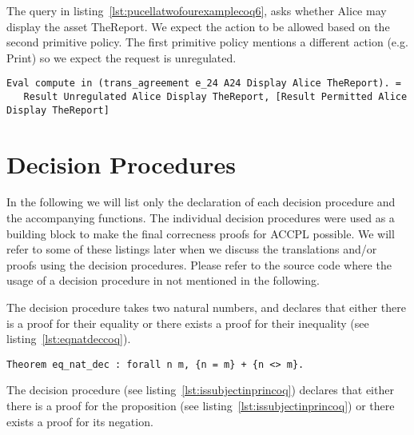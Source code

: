 The query in listing~\ref{lst:pucellatwofourexamplecoq6}, asks whether Alice may display the asset TheReport. We expect the action to be allowed based on the second primitive policy. The first primitive policy mentions a different action (e.g. Print) so we expect the request is unregulated. 

\begin{minipage}[c]{0.95\textwidth}
\begin{lstlisting}
Eval compute in (trans_agreement e_24 A24 Display Alice TheReport). = 
   Result Unregulated Alice Display TheReport, [Result Permitted Alice Display TheReport]
\end{lstlisting}
\end{minipage} 






\section{Decision Procedures}\label{sec:decprocs}

In the following we will list only the declaration of each decision procedure and the accompanying functions. The individual decision procedures were used as a building block to make the final correcness proofs for \ac{ACCPL} possible. We will refer to some of these listings later when we discuss the translations and/or proofs using the decision procedures. Please refer to the source code where the usage of a decision procedure in not mentioned in the following.

The decision procedure  takes two natural numbers, and declares that either there is a proof for their equality or there exists a proof for their inequality (see listing~\ref{lst:eqnatdeccoq}).

\begin{lstlisting}
Theorem eq_nat_dec : forall n m, {n = m} + {n <> m}.
\end{lstlisting}

The decision procedure  (see listing~\ref{lst:issubjectinprincoq}) declares that either there is a proof for the proposition  (see listing~\ref{lst:issubjectinprincoq}) or there exists a proof for its negation. 

